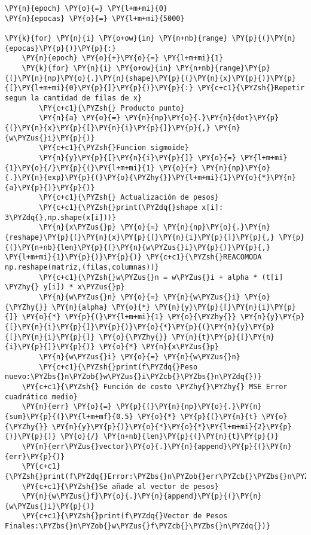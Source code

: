 \begin{tcolorbox}[breakable, size=fbox, boxrule=1pt, pad at break*=1mm,colback=cellbackground, colframe=cellborder]
\begin{Verbatim}[commandchars=\\\{\}]
\PY{n}{epoch} \PY{o}{=} \PY{l+m+mi}{0}
\PY{n}{epocas} \PY{o}{=} \PY{l+m+mi}{5000}

\PY{k}{for} \PY{n}{i} \PY{o+ow}{in} \PY{n+nb}{range} \PY{p}{(}\PY{n}{epocas}\PY{p}{)}\PY{p}{:}
    \PY{n}{epoch} \PY{o}{+}\PY{o}{=} \PY{l+m+mi}{1}
    \PY{k}{for} \PY{n}{i} \PY{o+ow}{in} \PY{n+nb}{range}\PY{p}{(}\PY{n}{np}\PY{o}{.}\PY{n}{shape}\PY{p}{(}\PY{n}{x}\PY{p}{)}\PY{p}{[}\PY{l+m+mi}{0}\PY{p}{]}\PY{p}{)}\PY{p}{:} \PY{c+c1}{\PYZsh{}Repetir segun la cantidad de filas de x}
        \PY{c+c1}{\PYZsh{} Producto punto}
        \PY{n}{a} \PY{o}{=} \PY{n}{np}\PY{o}{.}\PY{n}{dot}\PY{p}{(}\PY{n}{x}\PY{p}{[}\PY{n}{i}\PY{p}{]}\PY{p}{,} \PY{n}{w\PYZus{}i}\PY{p}{)}
        \PY{c+c1}{\PYZsh{}Funcion sigmoide}
        \PY{n}{y}\PY{p}{[}\PY{n}{i}\PY{p}{]} \PY{o}{=} \PY{l+m+mi}{1}\PY{o}{/}\PY{p}{(}\PY{l+m+mi}{1} \PY{o}{+} \PY{n}{np}\PY{o}{.}\PY{n}{exp}\PY{p}{(}\PY{o}{\PYZhy{}}\PY{l+m+mi}{1}\PY{o}{*}\PY{n}{a}\PY{p}{)}\PY{p}{)}
        \PY{c+c1}{\PYZsh{} Actualización de pesos}
        \PY{c+c1}{\PYZsh{}print(\PYZdq{}shape x[i]: 3\PYZdq{},np.shape(x[i]))}
        \PY{n}{x\PYZus{}p} \PY{o}{=} \PY{n}{np}\PY{o}{.}\PY{n}{reshape}\PY{p}{(}\PY{n}{x}\PY{p}{[}\PY{n}{i}\PY{p}{]}\PY{p}{,} \PY{p}{(}\PY{n+nb}{len}\PY{p}{(}\PY{n}{w\PYZus{}i}\PY{p}{)}\PY{p}{,} \PY{l+m+mi}{1}\PY{p}{)}\PY{p}{)} \PY{c+c1}{\PYZsh{}REACOMODA np.reshape(matriz,(filas,columnas))}
        \PY{c+c1}{\PYZsh{}w\PYZus{}n = w\PYZus{}i + alpha * (t[i] \PYZhy{} y[i]) * x\PYZus{}p}
        \PY{n}{w\PYZus{}n} \PY{o}{=} \PY{n}{w\PYZus{}i} \PY{o}{\PYZhy{}} \PY{n}{alpha} \PY{o}{*} \PY{n}{y}\PY{p}{[}\PY{n}{i}\PY{p}{]} \PY{o}{*} \PY{p}{(}\PY{l+m+mi}{1} \PY{o}{\PYZhy{}} \PY{n}{y}\PY{p}{[}\PY{n}{i}\PY{p}{]}\PY{p}{)}\PY{o}{*}\PY{p}{(}\PY{n}{y}\PY{p}{[}\PY{n}{i}\PY{p}{]} \PY{o}{\PYZhy{}} \PY{n}{t}\PY{p}{[}\PY{n}{i}\PY{p}{]}\PY{p}{)} \PY{o}{*} \PY{n}{x\PYZus{}p}
        \PY{n}{w\PYZus{}i} \PY{o}{=} \PY{n}{w\PYZus{}n}
        \PY{c+c1}{\PYZsh{}print(f\PYZdq{}Peso nuevo:\PYZbs{}n\PYZob{}w\PYZus{}i\PYZcb{}\PYZbs{}n\PYZdq{})}
    \PY{c+c1}{\PYZsh{} Función de costo \PYZhy{}\PYZhy{} MSE Error cuadrático medio}
    \PY{n}{err} \PY{o}{=} \PY{p}{(}\PY{n}{np}\PY{o}{.}\PY{n}{sum}\PY{p}{(}\PY{l+m+mf}{0.5} \PY{o}{*} \PY{p}{(}\PY{n}{t} \PY{o}{\PYZhy{}} \PY{n}{y}\PY{p}{)}\PY{o}{*}\PY{o}{*}\PY{l+m+mi}{2}\PY{p}{)}\PY{p}{)} \PY{o}{/} \PY{n+nb}{len}\PY{p}{(}\PY{n}{t}\PY{p}{)}
    \PY{n}{err\PYZus{}vector}\PY{o}{.}\PY{n}{append}\PY{p}{(}\PY{n}{err}\PY{p}{)}
    \PY{c+c1}{\PYZsh{}print(f\PYZdq{}Error:\PYZbs{}n\PYZob{}err\PYZcb{}\PYZbs{}n\PYZdq{})}
    \PY{c+c1}{\PYZsh{}Se añade al vector de pesos}
    \PY{n}{w\PYZus{}f}\PY{o}{.}\PY{n}{append}\PY{p}{(}\PY{n}{w\PYZus{}i}\PY{p}{)}
    \PY{c+c1}{\PYZsh{}print(f\PYZdq{}Vector de Pesos Finales:\PYZbs{}n\PYZob{}w\PYZus{}f\PYZcb{}\PYZbs{}n\PYZdq{})}
\end{Verbatim}
\end{tcolorbox}

